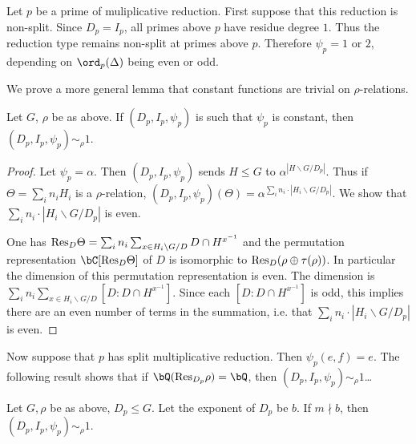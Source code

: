 Let $p$ be a prime of muliplicative reduction. First suppose that this reduction is non-split. Since $D_p = I_p$, all primes above $p$ have residue degree $1$. Thus the reduction type remains non-split at primes above $p$. Therefore $\psi_p = 1$ or $2$, depending on $\ord_p(\Delta)$ being even or odd. 

We prove a more general lemma that constant functions are trivial on $\rho$-relations.

\begin{lemma}
Let $G$, $\rho$ be as above. If $(D_p, I_p, \psi_p)$ is such that $\psi_p$ is constant, then $(D_p, I_p, \psi_p) \sim_{\rho} 1$.  
\end{lemma}   

\begin{proof}
    Let $\psi_p = \alpha$. Then $(D_p, I_p, \psi_p)$ sends $H \leq G$ to $\alpha^{| H \backslash G / D_p|}$. Thus if $\Theta = \sum_i n_i H_i$ is a $\rho$-relation, $(D_p, I_p, \psi_p)(\Theta) = \alpha^{ \sum_i n_i \cdot | H_i \backslash G / D_p|}$. We show that $\sum_i n_i \cdot | H_i \backslash G / D_p|$ is even. 

    One has $\mathrm{Res}_D \Theta = \sum_i n_i \sum_{x \in H_i \backslash G / D} D \cap H^{x^{-1}}$ and the permutation representation $\bC[\Res_D \Theta]$ of $D$ is isomorphic to $\mathrm{Res}_D (\rho \oplus \tau(\rho))$. In particular the dimension of this permutation representation is even. The dimension is $\sum_i n_i \sum_{x \in H_i \backslash G / D} [D \colon D \cap H^{x^{-1}} ]$. Since each $[D \colon D \cap H^{x^{-1}} ]$ is odd, this implies there are an even number of terms in the summation, i.e. that $\sum_i n_i \cdot | H_i \backslash G / D_p|$ is even. 
    
\end{proof}

Now suppose that $p$ has split multiplicative reduction. Then $\psi_p(e, f) = e$.
The following result shows that if $\bQ(\Res_{D_p}\rho ) = \bQ$, then $(D_p, I_p, \psi_p) \sim_{\rho} 1$\dots

\begin{lemma}
    Let $G, \rho$ be as above, $D_p \leq G$. Let the exponent of $D_p$ be $b$. If $m \nmid b$, then $(D_p, I_p, \psi_p) \sim_{\rho} 1$. 
\end{lemma}

